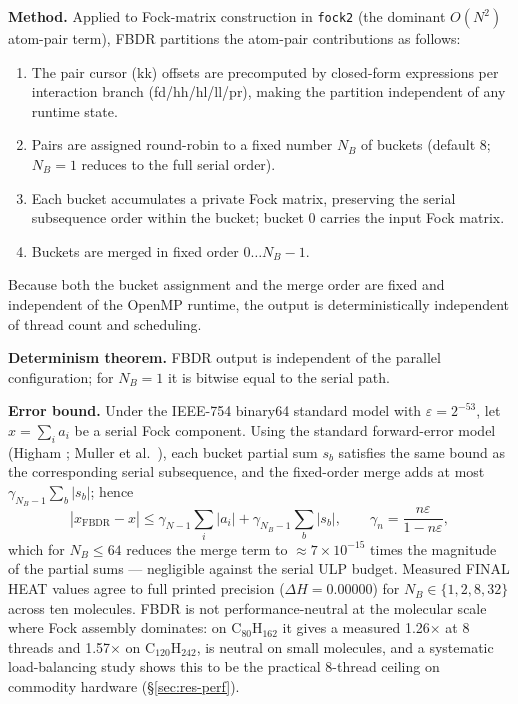 \documentclass[preprint,12pt]{elsarticle}
\begin{document}
\textbf{Method.} Applied to Fock-matrix construction in \texttt{fock2} (the dominant $O(N^2)$ atom-pair term), FBDR partitions the atom-pair contributions as follows:
\begin{enumerate}
\item The pair cursor (kk) offsets are precomputed by closed-form expressions per interaction branch (fd/hh/hl/ll/pr), making the partition independent of any runtime state.
\item Pairs are assigned round-robin to a fixed number $N_B$ of buckets (default 8; $N_B=1$ reduces to the full serial order).
\item Each bucket accumulates a private Fock matrix, preserving the serial subsequence order within the bucket; bucket 0 carries the input Fock matrix.
\item Buckets are merged in fixed order $0 \ldots N_B-1$.
\end{enumerate}
Because both the bucket assignment and the merge order are fixed and independent of the OpenMP runtime, the output is deterministically independent of thread count and scheduling.

\textbf{Determinism theorem.} FBDR output is independent of the parallel configuration; for $N_B=1$ it is bitwise equal to the serial path.

\textbf{Error bound.} Under the IEEE-754 binary64 standard model \cite{ieee754} with $\varepsilon = 2^{-53}$, let $x=\sum_i a_i$ be a serial Fock component. Using the standard forward-error model (Higham \cite{higham2002,higham1993}; Muller et al.\ \cite{muller2018}), each bucket partial sum $s_b$ satisfies the same bound as the corresponding serial subsequence, and the fixed-order merge adds at most $\gamma_{N_B-1}\sum_b |s_b|$; hence
\begin{equation}
  |\hat{x}_\mathrm{FBDR} - x| \le \gamma_{N-1}\sum_i |a_i| + \gamma_{N_B-1}\sum_b |s_b|, \qquad \gamma_n = \frac{n\varepsilon}{1-n\varepsilon},
\end{equation}
which for $N_B \le 64$ reduces the merge term to $\approx 7\times10^{-15}$ times the magnitude of the partial sums --- negligible against the serial ULP budget. Measured FINAL HEAT values agree to full printed precision ($\Delta H = 0.00000$) for $N_B \in \{1,2,8,32\}$ across ten molecules. FBDR is not performance-neutral at the molecular scale where Fock assembly dominates: on C$_{80}$H$_{162}$ it gives a measured 1.26$\times$ at 8 threads and 1.57$\times$ on C$_{120}$H$_{242}$, is neutral on small molecules, and a systematic load-balancing study shows this to be the practical 8-thread ceiling on commodity hardware (\S\ref{sec:res-perf}).
\end{document}

